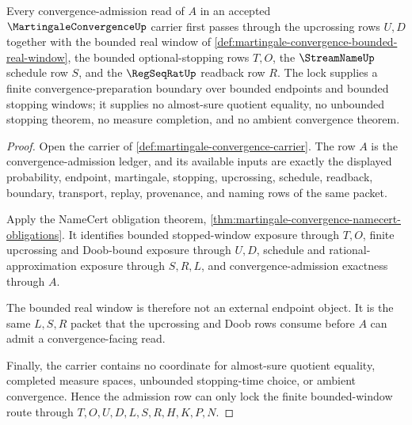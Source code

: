 \begin{theorem}
\label{thm:martingale-convergence-upcrossing-window-lock}
Every convergence-admission read of $A$ in an accepted $\MartingaleConvergenceUp$ carrier first passes through the upcrossing rows $U,D$ together with the bounded real window of \autoref{def:martingale-convergence-bounded-real-window}, the bounded optional-stopping rows $T,O$, the $\StreamNameUp$ schedule row $S$, and the $\RegSeqRatUp$ readback row $R$. The lock supplies a finite convergence-preparation boundary over bounded endpoints and bounded stopping windows; it supplies no almost-sure quotient equality, no unbounded stopping theorem, no measure completion, and no ambient convergence theorem.
\end{theorem}
\begin{proof}
Open the carrier of \autoref{def:martingale-convergence-carrier}. The row $A$ is the convergence-admission ledger, and its available inputs are exactly the displayed probability, endpoint, martingale, stopping, upcrossing, schedule, readback, boundary, transport, replay, provenance, and naming rows of the same packet.

Apply the NameCert obligation theorem, \autoref{thm:martingale-convergence-namecert-obligations}. It identifies bounded stopped-window exposure through $T,O$, finite upcrossing and Doob-bound exposure through $U,D$, schedule and rational-approximation exposure through $S,R,L$, and convergence-admission exactness through $A$.

The bounded real window is therefore not an external endpoint object. It is the same $L,S,R$ packet that the upcrossing and Doob rows consume before $A$ can admit a convergence-facing read.

Finally, the carrier contains no coordinate for almost-sure quotient equality, completed measure spaces, unbounded stopping-time choice, or ambient convergence. Hence the admission row can only lock the finite bounded-window route through $T,O,U,D,L,S,R,H,K,P,N$.
\end{proof}

